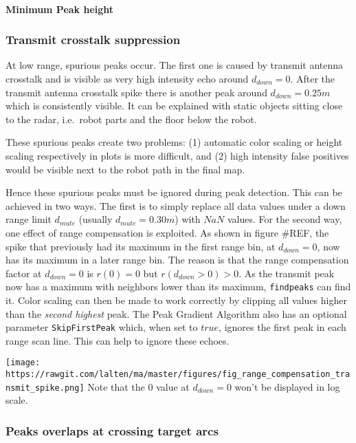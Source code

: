 \paragraph{Minimum Peak height}\label{minimum-peak-height}

\subsubsection{Transmit crosstalk
suppression}\label{transmit-crosstalk-suppression}

At low range, spurious peaks occur. The first one is caused by transmit
antenna crosstalk and is visible as very high intensity echo around
\(d_{down}=0\). After the transmit antenna crosstalk spike there is
another peak around \(d_{down}=0.25m\) which is consistently visible. It
can be explained with static objects sitting close to the radar,
i.e.~robot parts and the floor below the robot.

These spurious peaks create two problems: (1) automatic color scaling or
height scaling respectively in plots is more difficult, and (2) high
intensity false positives would be visible next to the robot path in the
final map.

Hence these spurious peaks must be ignored during peak detection. This
can be achieved in two ways. The first is to simply replace all data
values under a down range limit \(d_{mute}\) (usually
\(d_{mute}=0.30m\)) with \(NaN\) values. For the second way, one effect
of range compensation is exploited. As shown in figure \#REF, the spike
that previously had its maximum in the first range bin, at
\(d_{down}=0\), now has its maximum in a later range bin. The reason is
that the range compensation factor at \(d_{down}=0\) is \(r(0) = 0\) but
\(r(d_{down}>0) > 0\). As the transmit peak now has a maximum with
neighbors lower than its maximum, \texttt{findpeaks} can find it. Color
scaling can then be made to work correctly by clipping all values higher
than the \emph{second highest} peak. The Peak Gradient Algorithm also
has an optional parameter \texttt{SkipFirstPeak} which, when set to
\(true\), ignores the first peak in each range scan line. This can help
to ignore these echoes.

\texttt{[image: https://rawgit.com/lalten/ma/master/figures/fig\_range\_compensation\_transmit\_spike.png]}
Note that the \(0\) value at \(d_{down}=0\) won't be displayed in log
scale.

\subsubsection{Peaks overlaps at crossing target
arcs}\label{peaks-overlaps-at-crossing-target-arcs}

